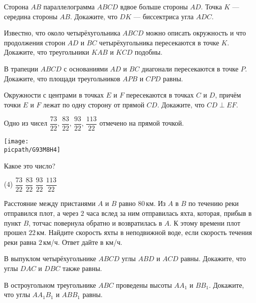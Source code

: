\begin{consultation}
	\begin{listofex}
		\item Сторона \( AB \) параллелограмма \( ABCD \) вдвое больше стороны \( AD \). Точка \( K \) --- середина стороны \( AB \). Докажите, что \( DK \) --- биссектриса угла \( ADC \).
		\item Известно, что около четырёхугольника \( ABCD \) можно описать окружность и что продолжения сторон \( AD \) и \( BC \) четырёхугольника пересекаются в точке \( K \). Докажите, что треугольники \( KAB \) и \( KCD \) подобны.
		\item В трапеции \( ABCD \) с основаниями \( AD \) и \( BC \) диагонали пересекаются в точке \( P \). Докажите, что площади треугольников \( APB \) и \( CPD \) равны.
		\item Окружности с центрами в точках \( E \) и \( F \) пересекаются в точках \( C \) и \( D \), причём точки \( E \) и \( F \) лежат по одну сторону от  прямой \( CD \). Докажите, что \( CD\perp EF \).
	\end{listofex}
\end{consultation}

\begin{homework}[number=4]
	\begin{listofex}
		\item Одно из чисел \( \dfrac{73}{22} \), \( \dfrac{83}{22} \), \( \dfrac{93}{22} \), \( \dfrac{113}{22} \) отмечено на прямой точкой.
		\begin{center}
			\texttt{[image: \\picpath/G93M8H4]}
		\end{center}
		Какое это число?
		\begin{tasks}(4)
			\task \( \dfrac{73}{22} \)
			\task \( \dfrac{83}{22} \)
			\task \( \dfrac{93}{22} \)
			\task \( \dfrac{113}{22} \)
		\end{tasks}
		\item Расстояние между пристанями \( A \) и \( B \) равно \( 80 \) км. Из \( A \) в \( B \) по течению реки отправился плот, а через \( 2 \) часа вслед за ним отправилась яхта, которая, прибыв в пункт \( B \), тотчас повернула обратно и возвратилась в \( A \). К этому времени плот прошел \( 22 \) км. Найдите скорость яхты в неподвижной воде, если скорость течения реки равна \( 2 \) км/ч. Ответ дайте в км/ч.
		\item В выпуклом четырёхугольнике \( ABCD \) углы \( ABD \) и \( ACD \) равны. Докажите, что углы \( DAC \) и \( DBC \) также равны.
		\item В остроугольном треугольнике \( ABC \) проведены высоты \( AA_1 \) и \( BB_1 \). Докажите, что углы \( AA_1B_1 \) и \( ABB_1 \) равны.
	\end{listofex}
\end{homework}
